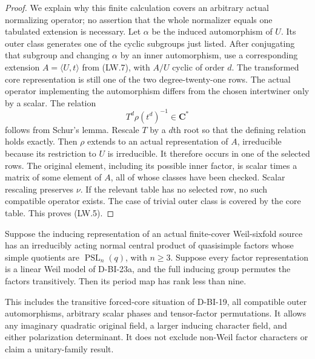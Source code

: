 \begin{proof}
We explain why this finite calculation covers an arbitrary actual
normalizing operator; no assertion that the whole normalizer equals
one tabulated extension is necessary. Let $\alpha$ be the induced
automorphism of $U$. Its outer class generates one of the cyclic
subgroups just listed. After conjugating that subgroup and changing
$\alpha$ by an inner automorphism, use a corresponding extension
$A=\langle U,t\rangle$ from (LW.7), with $A/U$ cyclic of order $d$.
The transformed core representation is still one of the two
degree-twenty-one rows. The actual operator implementing the
automorphism differs from the chosen intertwiner only by a scalar.
The relation
\[
            T^d\rho(t^d)^{-1}\in\mathbf C^*
                                                               \tag{LW.9}
\]
follows from Schur's lemma. Rescale $T$ by a $d$th root so that the
defining relation holds exactly. Then $\rho$ extends to an actual
representation of $A$, irreducible because its restriction to $U$
is irreducible. It therefore occurs in one of the selected rows.
The original element, including its possible inner factor, is scalar
times a matrix of some element of $A$, all of whose classes have
been checked. Scalar rescaling preserves $\nu$. If the relevant
table has no selected row, no such compatible operator exists.
The case of trivial outer class is covered by the core table.
This proves (LW.5).
\end{proof}

\begin{theorem}
\label{D-BI-23}
Suppose the inducing representation of an actual finite-cover
Weil-sixfold source has an irreducibly acting normal central product
of quasisimple factors whose simple quotients are
$\operatorname{PSL}_n(q)$, with $n\ge3$. Suppose every factor
representation is a linear Weil model of D-BI-23a, and the full
inducing group permutes the factors transitively. Then its period
map has rank less than nine.

This includes the transitive forced-core situation of D-BI-19,
all compatible outer automorphisms, arbitrary scalar phases and
tensor-factor permutations. It allows any imaginary quadratic
original field, a larger inducing character field, and either
polarization determinant. It does not exclude non-Weil factor
characters or claim a unitary-family result.
\end{theorem}


